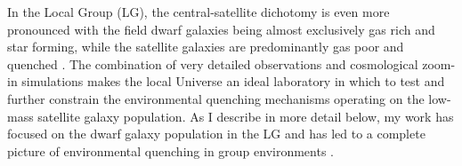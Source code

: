 In the Local Group (LG), the central-satellite dichotomy is even more
pronounced with the field dwarf galaxies being almost exclusively gas
rich and star forming, while the satellite galaxies are predominantly
gas poor and quenched \citep{spekkens14,wheeler14}. 
%
The combination of very detailed observations and cosmological
zoom-in simulations makes the local Universe an ideal laboratory in
which to test and further constrain the environmental quenching
mechanisms operating on the low-mass satellite galaxy population.
%
%
As I describe in more detail below, my work has focused on the dwarf
galaxy population in the LG and has led to a complete picture of
environmental quenching in group environments
\citep{fham15,fham16,fham18}.